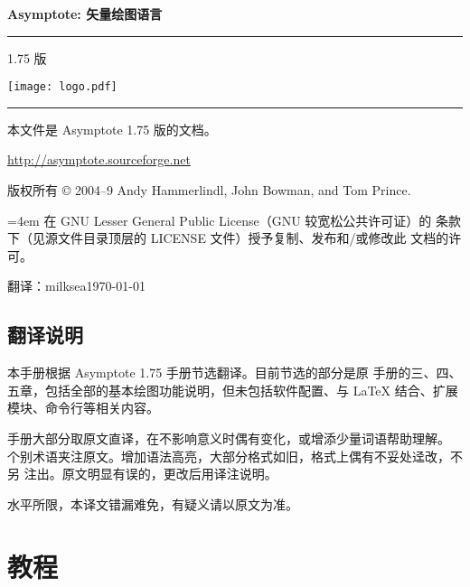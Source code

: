 \documentclass{ctexbook}
\newcommand*\prgname[1]{\textsf{#1}}
\newcommand\asyversion{1.75}
\begin{document}
\frontmatter

\begin{titlepage}
\setlength{\parindent}{0pt}
{\Huge\bfseries\prgname{Asymptote}: 矢量绘图语言}

\rule[0pt]{\textwidth}{4pt}

\hfill\asyversion{} 版

\centerline{\texttt{[image: logo.pdf]}}

\rule[0pt]{\textwidth}{2pt}

本文件是 \prgname{Asymptote} \asyversion{} 版的文档。

\url{http://asymptote.sourceforge.net}

版权所有 \copyright{} 2004--9 Andy Hammerlindl, John Bowman, and Tom Prince.

{\leftskip=4em 在 GNU Lesser General Public License（GNU 较宽松公共许可证）的
条款下（见源文件目录顶层的 \prgname{LICENSE} 文件）授予复制、发布和/或修改此
文档的许可。\par}

翻译：milksea\qquad\today
\end{titlepage}

\section*{翻译说明}

本手册根据 \prgname{Asymptote \asyversion} 手册节选翻译。目前节选的部分是原
手册的三、四、五章，包括全部的基本绘图功能说明，但未包括软件配置、与 \LaTeX{}
结合、扩展模块、命令行等相关内容。

手册大部分取原文直译，在不影响意义时偶有变化，或增添少量词语帮助理解。
个别术语夹注原文。增加语法高亮，大部分格式如旧，格式上偶有不妥处迳改，不另
注出。原文明显有误的，更改后用译注说明。

水平所限，本译文错漏难免，有疑义请以原文为准。


\tableofcontents

\mainmatter
\setcounter{chapter}{2}

\chapter{教程}
\label{chap:tutorial}
\end{document}
